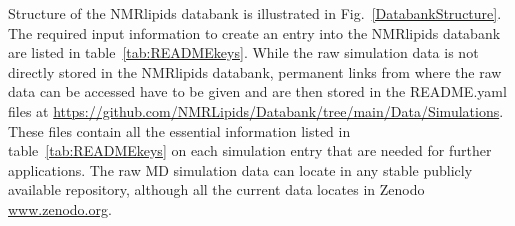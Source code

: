 \documentclass[fleqn,10pt]{wlscirep}
\begin{document}
Structure of the NMRlipids databank is illustrated in Fig.~\ref{DatabankStructure}. The required input information to create an entry into the NMRlipids databank are listed in table~\ref{tab:READMEkeys}. While the raw simulation data is not directly stored in the NMRlipids databank, permanent links from where the raw data can be accessed have to be given and are then stored in the README.yaml files at \url{https://github.com/NMRLipids/Databank/tree/main/Data/Simulations}. These files contain all the essential information listed in table~\ref{tab:READMEkeys} on each simulation entry that are needed for further applications. The raw MD simulation data can locate in any stable publicly available repository, although all the current data locates in Zenodo \url{www.zenodo.org}. 

\end{document}
